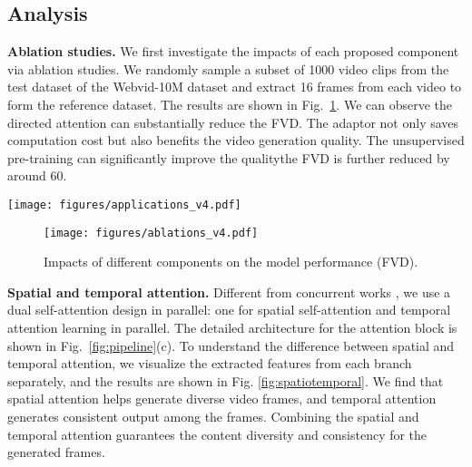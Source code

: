 \documentclass[10pt,twocolumn,letterpaper]{article}
\newcommand{\myPara}[1]{\vspace{6pt}\noindent\textbf{#1}}
\begin{document}
\subsection{Analysis}

\myPara{Ablation studies.} We first investigate the impacts of each proposed component via ablation studies. We randomly sample a subset of 1000 video clips from the test dataset of the Webvid-10M dataset and extract 16 frames from each video to form the reference dataset. The results are shown in Fig.~\ref{fig:ablation_FID}. We can observe the directed attention can substantially reduce the FVD. The adaptor not only saves computation cost but also benefits the video generation quality. The unsupervised pre-training can significantly improve the quality\textemdash the FVD is further reduced by around 60.


\begin{figure*}[t!] 
\centering
\texttt{[image: figures/applications\_v4.pdf]}
\vspace{-3mm}
\caption{\textbf{Applications based on MagicVideo.} The {{\bf green  bounding box}} denotes the source image/video frames. (a)    The video variation results. (b)    Given video clip of a driving bus,  we use text prompt of ``candies falling onto the ground" to MagicVideo for video editing. (c) Given an input image, MagicVideo can generate a short relevant video.  }
\vspace{-3mm}
\label{fig:applications}
\end{figure*}

\begin{figure}[h] 
\centering
\texttt{[image: figures/ablations\_v4.pdf]}
\caption{Impacts of different components on the model  performance (FVD).}
\label{fig:ablation_FID}
\end{figure}



\myPara{Spatial and temporal attention.}
Different from concurrent works \cite{singer_make--video_2022}, we use a dual self-attention design in parallel: one for spatial self-attention and temporal attention learning in parallel. The detailed architecture for the attention block is shown in Fig.~\ref{fig:pipeline}(c). To understand the difference between spatial and temporal attention, we visualize the extracted features from each branch separately, and the results are shown in Fig. \ref{fig:spatiotemporal}. We find that spatial attention helps generate diverse video frames, and temporal attention generates consistent output among the frames. Combining the spatial and temporal attention guarantees the content diversity and consistency for the generated frames.
\end{document}
